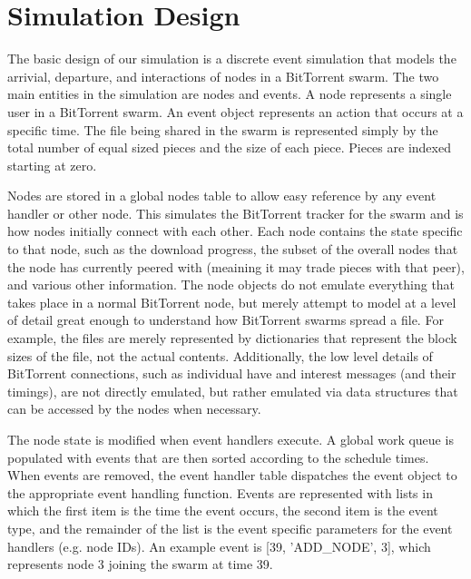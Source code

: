 \section{Simulation Design}

The basic design of our simulation is a discrete event simulation
that models the arrivial, departure, and interactions of nodes in a
BitTorrent swarm. The two main entities in the simulation are nodes
and events. A node represents a single user in a BitTorrent swarm.
An event object represents an action that occurs at a specific time.
The file being shared in the swarm is represented simply by the total
number of equal sized pieces and the size of each piece. Pieces are
indexed starting at zero.

Nodes are stored in a global nodes table to allow easy reference by
any event handler or other node. This simulates the BitTorrent tracker
for the swarm and is how nodes initially connect with each other. Each
node contains the state specific to that node, such as the download
progress, the subset of the overall nodes that the node has currently
peered with (meaining it may trade pieces with that peer), and various
other information. The node objects do not emulate everything that takes
place in a normal BitTorrent node, but merely attempt to model at a
level of detail great enough to understand how BitTorrent swarms spread
a file. For example, the files are merely represented by dictionaries
that represent the block sizes of the file, not the actual contents.
Additionally, the low level details of BitTorrent connections, such
as individual have and interest messages (and their timings), are not
directly emulated, but rather emulated via data structures that can be
accessed by the nodes when necessary.

The node state is modified when event handlers execute.
A global work queue is populated with events that are
then sorted according to the schedule times. When events are removed,
the event handler table dispatches the event object to the appropriate
event handling function. Events are represented with lists in which the first
item is the time the event occurs, the second item is the event type, and the remainder
of the list is the event specific parameters for the event handlers (e.g. node IDs).
An example event is [39, 'ADD\_NODE', 3], which represents node 3 joining the swarm at
time 39.

